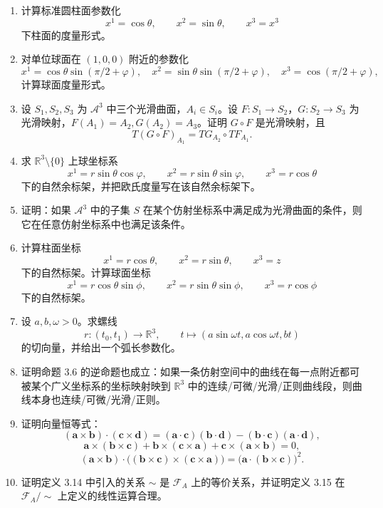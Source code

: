 \documentclass[UTF8,12pt,a4paper]{ctexart}
\newcommand{\A}{\mathcal A}
\newcommand{\R}{\mathbb R}
\newcommand{\vct}[1]{\boldsymbol{#1}}
\begin{document}
\begin{enumerate}
\item 计算标准圆柱面参数化
\[
x^1=\cos\theta,\qquad x^2=\sin\theta,\qquad x^3=x^3
\]
下柱面的度量形式。

\item 对单位球面在 $(1,0,0)$ 附近的参数化
\[
x^1=\cos\theta\sin(\pi/2+\varphi),\quad
x^2=\sin\theta\sin(\pi/2+\varphi),\quad
x^3=\cos(\pi/2+\varphi),
\]
计算球面度量形式。

\item 设 $S_1,S_2,S_3$ 为 $\A^3$ 中三个光滑曲面，$A_i\in S_i$。设 $F:S_1\to S_2$，$G:S_2\to S_3$ 为光滑映射，$F(A_1)=A_2,G(A_2)=A_3$。证明 $G\circ F$ 是光滑映射，且
\[
T(G\circ F)_{A_1}=TG_{A_2}\circ TF_{A_1}.
\]

\item 求 $\R^3\setminus\{0\}$ 上球坐标系
\[
x^1=r\sin\theta\cos\varphi,\qquad
x^2=r\sin\theta\sin\varphi,\qquad
x^3=r\cos\theta
\]
下的自然余标架，并把欧氏度量写在该自然余标架下。

\item 证明：如果 $\A^3$ 中的子集 $S$ 在某个仿射坐标系中满足成为光滑曲面的条件，则它在任意仿射坐标系中也满足该条件。

\item 计算柱面坐标
\[
x^1=r\cos\theta,\qquad x^2=r\sin\theta,\qquad x^3=z
\]
下的自然标架。计算球面坐标
\[
x^1=r\cos\theta\sin\phi,\qquad x^2=r\sin\theta\sin\phi,\qquad x^3=r\cos\phi
\]
下的自然标架。

\item 设 $a,b,\omega>0$。求螺线
\[
r:(t_0,t_1)\to\R^3,\qquad t\mapsto(a\sin\omega t,a\cos\omega t,bt)
\]
的切向量，并给出一个弧长参数化。

\item 证明命题 3.6 的逆命题也成立：如果一条仿射空间中的曲线在每一点附近都可被某个广义坐标系的坐标映射映到 $\R^3$ 中的连续/可微/光滑/正则曲线段，则曲线本身也连续/可微/光滑/正则。

\item 证明向量恒等式：
\[
(\vct a\times\vct b)\cdot(\vct c\times\vct d)
=(\vct a\cdot\vct c)(\vct b\cdot\vct d)-(\vct b\cdot\vct c)(\vct a\cdot\vct d),
\]
\[
\vct a\times(\vct b\times\vct c)+\vct b\times(\vct c\times\vct a)+\vct c\times(\vct a\times\vct b)=0,
\]
\[
(\vct a\times\vct b)\cdot\bigl((\vct b\times\vct c)\times(\vct c\times\vct a)\bigr)
=\bigl(\vct a\cdot(\vct b\times\vct c)\bigr)^2.
\]

\item 证明定义 3.14 中引入的关系 $\sim$ 是 $\mathcal F_A$ 上的等价关系，并证明定义 3.15 在 $\mathcal F_A/\sim$ 上定义的线性运算合理。


\end{enumerate}
\end{document}
